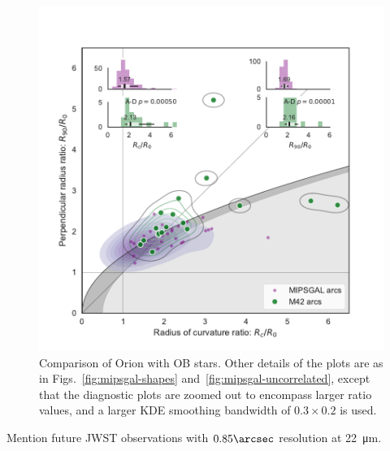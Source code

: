 \begin{figure}
  \centering
  \includegraphics[width=0.8\linewidth]{figs/mipsgal-Rc-R90-vs-Orion}
  \caption[]{Comparison of Orion with OB stars.  Other details of the
    plots are as in Figs.~\ref{fig:mipsgal-shapes}
    and~\ref{fig:mipsgal-uncorrelated}, except that the diagnostic
    plots are zoomed out to encompass larger ratio values, and a
    larger KDE smoothing bandwidth of \(0.3 \times 0.2\) is used.}
  \label{fig:ll-compare-mipsgal}
\end{figure}


Mention future JWST observations with \(0.85\arcsec\) resolution at \SI{22}{\um}. 


